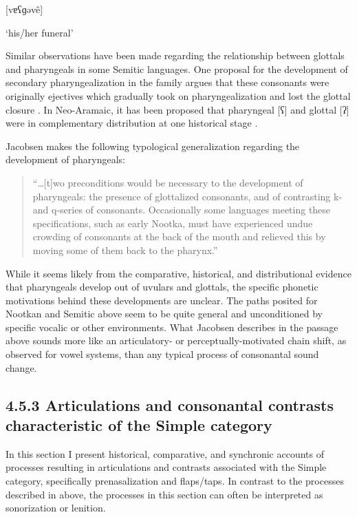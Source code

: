 [vɐʕɡəvê]

‘his/her funeral’

\citep[62]{Gong2018}

\z

  Similar observations have been made regarding the relationship between glottals and pharyngeals in some Semitic languages. One proposal for the development of secondary pharyngealization in the family argues that these consonants were originally ejectives which gradually took on pharyngealization and lost the glottal closure \citep{Zemánek1996}. In Neo-Aramaic, it has been proposed that pharyngeal [ʕ] and glottal [ʔ] were in complementary distribution at one historical stage \citep{Hoberman1985}.

  Jacobsen makes the following typological generalization regarding the development of pharyngeals:

\begin{quote}
“…[t]wo preconditions would be necessary to the development of pharyngeals: the presence of glottalized consonants, and of contrasting k- and q-series of consonants. Occasionally some languages meeting these specifications, such as early Nootka, must have experienced undue crowding of consonants at the back of the mouth and relieved this by moving some of them back to the pharynx.” 

\citep[152]{Jacobsen1969}
\end{quote}

  While it seems likely from the comparative, historical, and distributional evidence that pharyngeals develop out of uvulars and glottals, the specific phonetic motivations behind these developments are unclear. The paths posited for Nootkan and Semitic above seem to be quite general and unconditioned by specific vocalic or other environments. What Jacobsen describes in the passage above sounds more like an articulatory- or perceptually-motivated chain shift, as observed for vowel systems, than any typical process of consonantal sound change.

\subsection{\rmfamily} 
\subsection{4.5.3 Articulations and consonantal contrasts characteristic of the Simple category}

  In this section I present historical, comparative, and synchronic accounts of processes resulting in articulations and contrasts associated with the Simple category, specifically prenasalization and flaps/taps. In contrast to the processes described in  above, the processes in this section can often be interpreted as sonorization or lenition.


